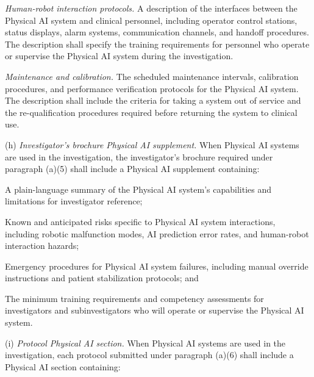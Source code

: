 \documentclass[11pt]{article}
\begin{document}
\begin{description}[leftmargin=0.8cm,style=sameline]
\item[(x)] \textit{Human-robot interaction protocols.} A description of the interfaces between the Physical AI system and clinical personnel, including operator control stations, status displays, alarm systems, communication channels, and handoff procedures. The description shall specify the training requirements for personnel who operate or supervise the Physical AI system during the investigation.

\item[(xi)] \textit{Maintenance and calibration.} The scheduled maintenance intervals, calibration procedures, and performance verification protocols for the Physical AI system. The description shall include the criteria for taking a system out of service and the re-qualification procedures required before returning the system to clinical use.
\end{description}

(h) \textit{Investigator's brochure Physical AI supplement.} When Physical AI systems are used in the investigation, the investigator's brochure required under paragraph (a)(5) shall include a Physical AI supplement containing:

\begin{description}[leftmargin=0.8cm,style=sameline]
\item[(i)] A plain-language summary of the Physical AI system's capabilities and limitations for investigator reference;
\item[(ii)] Known and anticipated risks specific to Physical AI system interactions, including robotic malfunction modes, AI prediction error rates, and human-robot interaction hazards;
\item[(iii)] Emergency procedures for Physical AI system failures, including manual override instructions and patient stabilization protocols; and
\item[(iv)] The minimum training requirements and competency assessments for investigators and subinvestigators who will operate or supervise the Physical AI system.
\end{description}

(i) \textit{Protocol Physical AI section.} When Physical AI systems are used in the investigation, each protocol submitted under paragraph (a)(6) shall include a Physical AI section containing:
\end{document}
